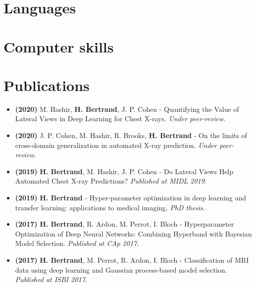 \documentclass[11pt,a4paper,sans]{moderncv}        %
\begin{document}
\section{Languages}


\section{Computer skills}


\section{Publications}

\begin{itemize}
    \item \textbf{(2020)} M. Hashir, \textbf{H. Bertrand}, J. P. Cohen - Quantifying the Value of Lateral Views in Deep Learning for Chest X-rays. \textit{Under peer-review.}
    \item \textbf{(2020)} J. P. Cohen, M. Hashir, R. Brooks, \textbf{H. Bertrand} - On the limits of cross-domain generalization in automated X-ray prediction. \textit{Under peer-review.}
    \item \textbf{(2019)} \textbf{H. Bertrand}, M. Hashir, J. P. Cohen - Do Lateral Views Help Automated Chest X-ray Predictions? \textit{Published at MIDL 2019.}
    \item \textbf{(2019)} \textbf{H. Bertrand} - Hyper-parameter optimization in deep learning and transfer learning: applications to medical imaging. \textit{PhD thesis.}
    \item \textbf{(2017)} \textbf{H. Bertrand}, R. Ardon, M. Perrot, I. Bloch - Hyperparameter Optimization of Deep Neural Networks: Combining Hyperband with Bayesian Model Selection. \textit{Published at CAp 2017.}
    \item \textbf{(2017)} \textbf{H. Bertrand}, M. Perrot, R. Ardon, I. Bloch - Classification of MRI data using deep learning and Gaussian process-based model selection. \textit{Published at ISBI 2017.}
\end{itemize}
\end{document}
